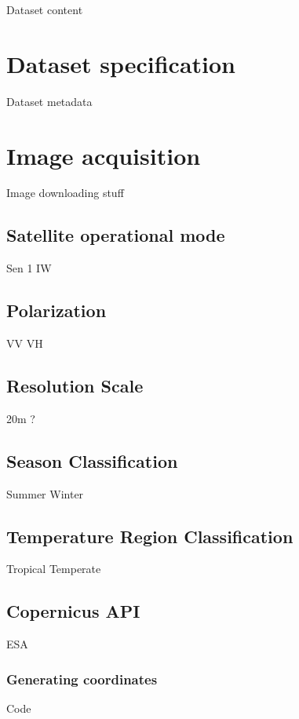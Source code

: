 Dataset content

\section{Dataset specification}

Dataset metadata

\section{Image acquisition}

Image downloading stuff

\subsection{Satellite operational mode}

Sen 1 IW

\subsection{Polarization}

VV VH

\subsection{Resolution Scale}

20m ?

\subsection{Season Classification}

Summer Winter

\subsection{Temperature Region Classification}

Tropical Temperate

\subsection{Copernicus API}

ESA

\subsubsection{Generating coordinates}

Code

